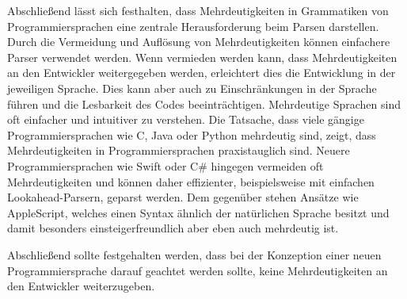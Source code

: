 \documentclass[runningheads]{llncs}
\begin{document}
	Abschließend lässt sich festhalten, dass Mehrdeutigkeiten in Grammatiken von Programmiersprachen
	eine zentrale Herausforderung beim Parsen darstellen.
	Durch die Vermeidung und Auflösung von Mehrdeutigkeiten können einfachere Parser verwendet werden.
	Wenn vermieden werden kann, dass Mehrdeutigkeiten an den Entwickler weitergegeben werden,
	erleichtert dies die Entwicklung in der jeweiligen Sprache.
	Dies kann aber auch zu Einschränkungen in der Sprache führen und die Lesbarkeit des Codes beeinträchtigen.
	Mehrdeutige Sprachen sind oft einfacher und intuitiver zu verstehen.
	Die Tatsache, dass viele gängige Programmiersprachen wie C, Java oder Python mehrdeutig sind,
	zeigt, dass Mehrdeutigkeiten in Programmiersprachen praxistauglich sind.
	Neuere Programmiersprachen wie Swift oder C\# hingegen vermeiden oft Mehrdeutigkeiten
	und können daher effizienter, beispielsweise mit einfachen Lookahead-Parsern, geparst werden.
	Dem gegenüber stehen Ansätze wie AppleScript,
	welches einen Syntax ähnlich der natürlichen Sprache besitzt
	und damit besonders einsteigerfreundlich aber eben auch mehrdeutig ist.

	Abschließend sollte festgehalten werden, dass bei der Konzeption einer neuen Programmiersprache
	darauf geachtet werden sollte, keine Mehrdeutigkeiten an den Entwickler weiterzugeben.

%
%
%


	\nocite{*}
	
	
\end{document}
